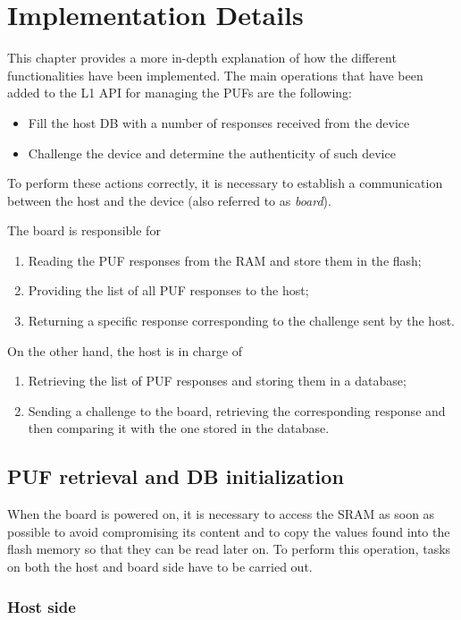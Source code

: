 \chapter{Implementation Details}
This chapter provides a more in-depth explanation of how the different functionalities have been implemented. The main operations that have been added to the L1 API for managing the PUFs are the following:
\begin{itemize}
	\item Fill the host DB with a number of responses received from the device
 	\item Challenge the device and determine the authenticity of such device  
\end{itemize}

To perform these actions correctly, it is necessary to establish a communication between the host and the device (also referred to as \emph{board}). 

The board is responsible for
\begin{enumerate}
	\item Reading the PUF responses from the RAM and store them in the flash;
	\item Providing the list of all PUF responses to the host;
	\item Returning a specific response corresponding to the challenge sent by the host.
\end{enumerate}

On the other hand, the host is in charge of
\begin{enumerate}
	\item Retrieving the list of PUF responses and storing them in a database;
	\item Sending a challenge to the board, retrieving the corresponding response and then comparing it with the one stored in the database.
\end{enumerate}


\section {PUF retrieval and DB initialization}
When the board is powered on, it is necessary to access the SRAM as soon as possible to avoid compromising its content and to copy the values found into the flash memory so that they can be read later on. To perform this operation, tasks on both the host and board side have to be carried out.

\subsection{Host side}

